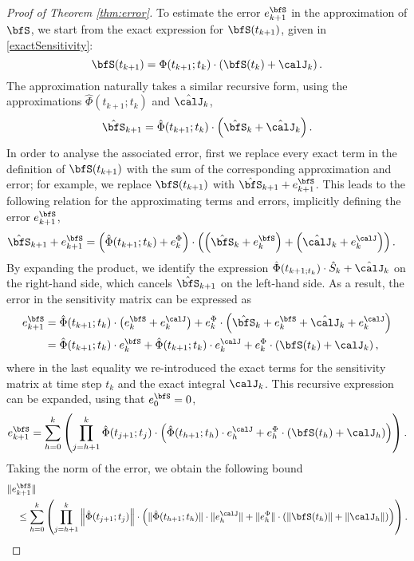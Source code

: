 \documentclass[DIV=12]{scrartcl} %
\newcommand{\err}{\ensuremath{e}}
\theoremstyle{definition}
\begin{document}
\begin{proof}[Proof of Theorem \ref{thm:error}]
To estimate the error $\err_{k+1}^\bfS$ in the approximation of $\bfS$, we start from the exact expression for $\bfS(t_{k+1})$, given in \eqref{exactSensitivity}:
\[
    \bfS(t_{k+1}) = \Phi(t_{k+1};t_k)\cdot\left(\bfS(t_k)+\calJ_k\right).
\]
The approximation naturally takes a similar recursive form, using the approximations $\hat \Phi (t_{k+1};t_k)$ and $\hat \calJ _k$,
\[
    \hat \bfS _{k+1} = \hat \Phi (t_{k+1};t_k) \cdot\left(\hat \bfS _k+\hat \calJ_k\right).
\]
In order to analyse the associated error, first we replace every exact term in the definition of $\bfS (t_{k+1})$ with the sum of the corresponding  approximation and error; for example, we replace $\bfS(t_{k+1})$ with $\hat{\bfS}_{k+1}+\err_{k+1}^{\bfS}$. This leads to the following relation for the approximating terms and errors, implicitly defining the error $\err_{k+1}^\bfS$,
\begin{align*}
    \hat{\bfS}_{k+1}+\err_{k+1}^\bfS&=\left(\hat{\Phi}(t_{k+1};t_k)+\err_k^{\Phi}\right)\cdot\left(\left(\hat{\bfS}_k+\err_k^{\bfS}\right)+\left(\hat{\calJ}_k+\err_k^\calJ\right)\right).
\end{align*}
By expanding the product, we identify the expression $\hat{\Phi}(t_{k+1;t_k})\cdot \hat{S}_k+\hat{\calJ}_k$ on the right-hand side, which cancels $\hat{\bfS}_{k+1}$ on the left-hand side. 
As a result, the error in the sensitivity matrix can be expressed as
\begin{align*}
    \err_{k+1}^\bfS&=\hat{\Phi}(t_{k+1};t_k)\cdot\left(\err_k^\bfS+\err_k^{\calJ}\right)+\err_k^{\Phi}\cdot \left(\hat{\bfS}_k+\err_k^{\bfS}+\hat{\calJ}_k+\err_k^{\calJ}\right)\\
    &=\hat{\Phi}(t_{k+1};t_k)\cdot \err_k^\bfS+\hat{\Phi}(t_{k+1};t_k)\cdot \err_k^{\calJ}+\err_k^{\Phi}\cdot \left(\bfS(t_k)+\calJ_k\right),
\end{align*}
where in the last equality we re-introduced the exact terms for the sensitivity matrix at time step $t_k$ and the exact integral $\calJ_k$. This recursive expression can be expanded, using that $\err_0^\bfS=0$,
\[
\err_{k+1}^\bfS = \sum_{h=0}^k\left(\prod_{j=h+1}^k\hat{\Phi}(t_{j+1};t_j)\cdot\left(\hat{\Phi}(t_{h+1};t_h)\cdot \err_h^{\calJ}+\err_h^\Phi\cdot(\bfS(t_h)+\calJ_h)\right)\right).
\]
Taking the norm of the error, we obtain the following bound
\begin{align}
    \label{inequalityErrS}
   & \|\err_{k+1}^\bfS\| \nonumber \\
   &\quad \le \sum_{h=0}^k\left(\prod_{j=h+1}^k\left\|\hat{\Phi}(t_{j+1};t_j)\right\|\cdot\left(\|\hat{\Phi}(t_{h+1};t_h)\|\cdot \|\err_h^{\calJ}\|+\|\err_h^\Phi\|\cdot(\|\bfS(t_h)\|+\|\calJ_h\|)\right)\right).
\end{align}


\end{proof}
\end{document}
